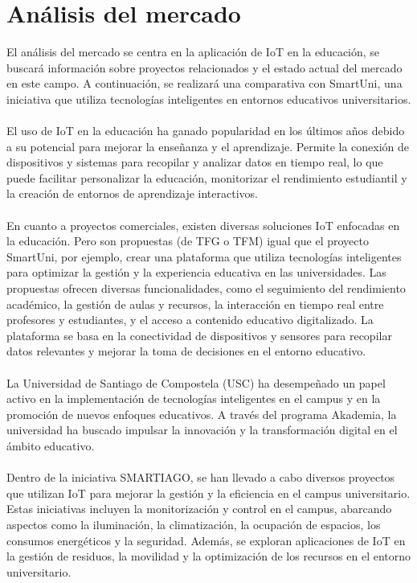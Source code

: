 \documentclass[12pt]{report}
\begin{document}
\section{Análisis del mercado}
El análisis del mercado se centra en la aplicación de IoT en la educación, se buscará información sobre proyectos relacionados y el estado actual del mercado en este campo. A continuación, se realizará una comparativa con SmartUni, una iniciativa que utiliza tecnologías inteligentes en entornos educativos universitarios.
\\\\
El uso de IoT en la educación ha ganado popularidad en los últimos años debido a su potencial para mejorar la enseñanza y el aprendizaje. Permite la conexión de dispositivos y sistemas para recopilar y analizar datos en tiempo real, lo que puede facilitar personalizar la educación, monitorizar el rendimiento estudiantil y la creación de entornos de aprendizaje interactivos.
\\\\
En cuanto a proyectos comerciales, existen diversas soluciones IoT enfocadas en la educación. Pero son propuestas (de TFG o TFM) igual que el proyecto SmartUni, por ejemplo, crear una plataforma que utiliza tecnologías inteligentes para optimizar la gestión y la experiencia educativa en las universidades. Las propuestas ofrecen diversas funcionalidades, como el seguimiento del rendimiento académico, la gestión de aulas y recursos, la interacción en tiempo real entre profesores y estudiantes, y el acceso a contenido educativo digitalizado. La plataforma se basa en la conectividad de dispositivos y sensores para recopilar datos relevantes y mejorar la toma de decisiones en el entorno educativo.
\\\\
La Universidad de Santiago de Compostela (USC) ha desempeñado un papel activo en la implementación de tecnologías inteligentes en el campus y en la promoción de nuevos enfoques educativos. A través del programa Akademia, la universidad ha buscado impulsar la innovación y la transformación digital en el ámbito educativo.
\\\\
Dentro de la iniciativa SMARTIAGO, se han llevado a cabo diversos proyectos que utilizan IoT para mejorar la gestión y la eficiencia en el campus universitario. Estas iniciativas incluyen la monitorización y control en el campus, abarcando aspectos como la iluminación, la climatización, la ocupación de espacios, los consumos energéticos y la seguridad. Además, se exploran aplicaciones de IoT en la gestión de residuos, la movilidad y la optimización de los recursos en el entorno universitario.
\end{document}
